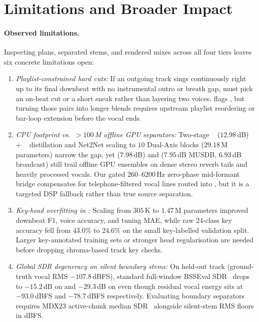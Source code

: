 \section{Limitations and Broader Impact}
\label{sec:limitations}

\paragraph{Observed limitations.}
Inspecting plans, separated stems, and rendered mixes across all four \sone{} tiers leaves six concrete limitations open:
\begin{enumerate}
  \item \emph{Playlist-constrained hard cuts:} If an outgoing track sings continuously right up to its final downbeat with no instrumental outro or breath gap,  must pick an on-beat cut or a short sneak rather than layering two voices.  flags , but turning those pairs into longer blends requires upstream playlist reordering or bar-loop extension before the vocal ends.
  \item \emph{CPU footprint vs.\ $>100$\,M offline GPU separators:} Two-stage ~\citep{lu2024bsroformer} ($12.98$\,dB) + ~\citep{rouard2023hybrid} distillation and Net2Net scaling to $10$ Dual-Axis blocks ($29.18$\,M parameters) narrow the gap, yet  ($7.98$\,dB) and  ($7.95$\,dB MUSDB, $6.93$\,dB broadcast) still trail offline GPU ensembles on dense stereo reverb tails and heavily processed vocals. Our gated $260$--$6200$\,Hz zero-phase mid-formant bridge compensates for telephone-filtered vocal lines routed into , but it is a targeted DSP fallback rather than true source separation.
  \item \emph{Key-head overfitting in :} Scaling  from $305$\,K to $1.47$\,M parameters improved downbeat F1, voice accuracy, and tuning MAE, while raw $24$-class key accuracy fell from $43.0\%$ to $24.6\%$ on the small key-labelled validation split. Larger key-annotated training sets or stronger head regularisation are needed before dropping chroma-based track key checks.
  \item \emph{Global SDR degeneracy on silent boundary stems:} On held-out track  (ground-truth vocal RMS $-107.8$\,dBFS), standard full-window BSSEval SDR~\citep{vincent2006performance} drops to $-15.2$\,dB on  and $-29.3$\,dB on  even though residual vocal energy sits at $-93.0$\,dBFS and $-78.7$\,dBFS respectively. Evaluating boundary separators requires MDX23 active-chunk median SDR~\citep{fabbro2024sdx} alongside silent-stem RMS floors in dBFS.

\end{enumerate}
